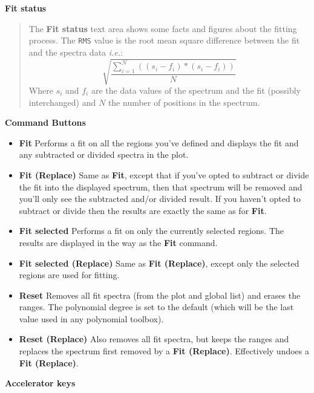 \documentclass[twoside,11pt]{article}
\renewcommand{\_}{\texttt{\symbol{95}}}
\newcommand{\labelitem}[1]{\textbf{#1}}
\newcommand{\hitext}[1]{\texttt{#1}}
\newcommand{\ie}{\textit{i.e.}}
\newcommand{\subheading}[1]{\textbf{\large{#1}}}
\begin{document}
\subheading{Fit status}
\begin{quote}
 The \labelitem{Fit status} text area shows some facts and figures about
 the fitting process. The \hitext{RMS} value is the root mean square
 difference between the fit and the spectra data \ie:
 \[
 \displaystyle\sqrt{
    \displaystyle\frac{
       \displaystyle\sum_{i=1}^{N}((s_{i}-f_{i})*(s_{i}-f_{i}))}{N}}
 \]
 Where $s_{i}$ and $f_{i}$ are the data values of the spectrum and the
 fit (possibly interchanged) and $N$ the number of positions in the
 spectrum.
\end{quote}

\subheading{Command Buttons}

\begin{itemize}

\item \labelitem{Fit} Performs a fit on all the regions you've defined and displays
the fit and any subtracted or divided spectra in the plot.

\item \labelitem{Fit (Replace)} Same as \labelitem{Fit}, except that if you've
opted to subtract or divide the fit into the displayed spectrum, then that
spectrum will be removed and you'll only see the subtracted and/or divided
result. If you haven't opted to subtract or divide then the results are
exactly the same as for \labelitem{Fit}.

\item \labelitem{Fit selected} Performs a fit on only the currently selected
regions. The results are displayed in the way as the \labelitem{Fit} command.

\item \labelitem{Fit selected (Replace)} Same as \labelitem{Fit (Replace)},
except only the selected regions are used for fitting.

\item \labelitem{Reset} Removes all fit spectra (from the plot and global list)
and erases the ranges. The polynomial degree is set to the default (which will
be the last value used in any polynomial toolbox).

\item \labelitem{Reset (Replace)} Also removes all fit spectra, but keeps the
ranges and replaces the spectrum first removed by a \labelitem{Fit (Replace)}.
Effectively undoes a \labelitem{Fit (Replace)}.

\end{itemize}

\subheading{Accelerator keys}
\end{document}
